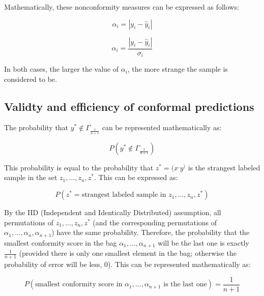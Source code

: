 Mathematically, these nonconformity measures can be expressed as follows:

$$ \alpha_i = \left| y_i - \hat{y}_i \right| $$

$$ \alpha_i = \frac{\left| y_i - \hat{y}_i \right|}{\sigma_i} $$

In both cases, the larger the value of $\alpha_i$, the more strange the sample is considered to be.

\subsection{Validty and efficiency of conformal predictions}
The probability that $y^* \not\in \Gamma_{\frac{1}{n+1}}$ can be represented mathematically as:

$$P(y^* \not\in \Gamma_{\frac{1}{n+1}})$$

This probability is equal to the probability that $z^* = (x^, y^)$ is the strangest labeled sample in the set $z_1, ..., z_n, z^*$. This can be expressed as:

$$P(z^* = \text{strangest labeled sample in } z_1, ..., z_n, z^*)$$

By the IID (Independent and Identically Distributed) assumption, all permutations of $z_1, ..., z_n, z^*$ (and the corresponding permutations of $\alpha_1, ..., \alpha_n, \alpha_{n+1}$) have the same probability. Therefore, the probability that the smallest conformity score in the bag ${\alpha_1, ..., \alpha_{n+1}}$ will be the last one is exactly $\frac{1}{n+1}$ (provided there is only one smallest element in the bag; otherwise the probability of error will be less, 0). This can be represented mathematically as:

$$P(\text{smallest conformity score in } {\alpha_1, ..., \alpha_{n+1}} \text{ is the last one}) = \frac{1}{n+1}$$
